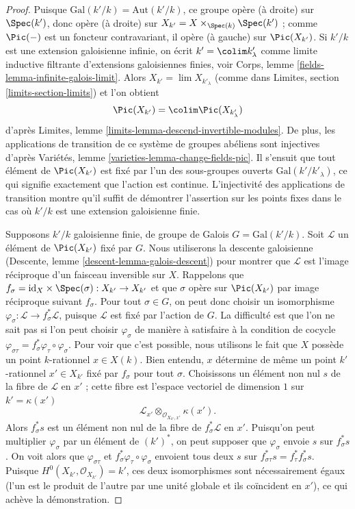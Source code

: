 \begin{proof}
Puisque $\text{Gal}(k'/k) = \text{Aut}(k'/k)$, ce groupe opère (à droite)
sur $\Spec(k')$, donc opère (à droite) sur
$X_{k'} = X \times_{\Spec(k)} \Spec(k')$ ; comme $\Pic(-)$
est un foncteur contravariant, il opère (à gauche) sur $\Pic(X_{k'})$.
Si $k'/k$ est une extension galoisienne infinie, on écrit
$k' = \colim k'_\lambda$ comme limite inductive filtrante d'extensions galoisiennes
finies, voir Corps, lemme \ref{fields-lemma-infinite-galois-limit}.
Alors $X_{k'} = \lim X_{k'_\lambda}$
(comme dans Limites, section \ref{limits-section-limits})
et l'on obtient
$$
\Pic(X_{k'}) = \colim \Pic(X_{k'_\lambda})
$$
d'après Limites, lemme \ref{limits-lemma-descend-invertible-modules}.
De plus, les applications de transition de ce système de groupes abéliens
sont injectives d'après Variétés, lemme \ref{varieties-lemma-change-fields-pic}.
Il s'ensuit que tout élément de $\Pic(X_{k'})$ est fixé par
l'un des sous-groupes ouverts $\text{Gal}(k'/k'_\lambda)$, ce qui signifie exactement
que l'action est continue. L'injectivité des applications de transition
montre qu'il suffit de démontrer l'assertion sur les points fixes dans le
cas où $k'/k$ est une extension galoisienne finie.

\medskip\noindent
Supposons $k'/k$ galoisienne finie, de groupe de Galois $G = \text{Gal}(k'/k)$.
Soit $\mathcal{L}$ un élément de $\Pic(X_{k'})$ fixé par $G$.
Nous utiliserons la descente galoisienne (Descente, lemme \ref{descent-lemma-galois-descent})
pour montrer que $\mathcal{L}$ est l'image réciproque d'un faisceau inversible sur $X$.
Rappelons que $f_\sigma = \text{id}_X \times \Spec(\sigma) : X_{k'} \to X_{k'}$
et que $\sigma$ opère sur $\Pic(X_{k'})$ par image réciproque suivant $f_\sigma$.
Pour tout $\sigma \in G$, on peut donc choisir un isomorphisme
$\varphi_\sigma : \mathcal{L} \to f_\sigma^*\mathcal{L}$,
puisque $\mathcal{L}$ est fixé par l'action de $G$.
La difficulté est que l'on ne sait pas si l'on peut choisir
$\varphi_\sigma$ de manière à satisfaire à la condition de cocycle
$\varphi_{\sigma\tau} = f_\sigma^*\varphi_\tau \circ \varphi_\sigma$.
Pour voir que c'est possible, nous utilisons le fait que $X$ possède un point $k$-rationnel
$x \in X(k)$. Bien entendu, $x$ détermine de même un point $k'$-rationnel
$x' \in X_{k'}$ fixé par $f_\sigma$ pour tout $\sigma$.
Choisissons un élément non nul $s$ de la fibre de $\mathcal{L}$ en $x'$ ;
cette fibre est l'espace vectoriel de dimension $1$ sur $k' = \kappa(x')$
$$
\mathcal{L}_{x'} \otimes_{\mathcal{O}_{X_{k'}, x'}} \kappa(x').
$$
Alors $f_\sigma^*s$ est un élément non nul de la fibre de
$f_\sigma^*\mathcal{L}$ en $x'$. Puisqu'on peut multiplier $\varphi_\sigma$
par un élément de $(k')^*$, on peut supposer que $\varphi_\sigma$ envoie
$s$ sur $f_\sigma^*s$. On voit alors que $\varphi_{\sigma\tau}$ et
$f_\sigma^*\varphi_\tau \circ \varphi_\sigma$
envoient tous deux $s$ sur $f_{\sigma\tau}^*s = f_\tau^*f_\sigma^*s$.
Puisque $H^0(X_{k'}, \mathcal{O}_{X_{k'}}) = k'$, ces deux isomorphismes
sont nécessairement égaux (l'un est le produit de l'autre par une unité globale
et ils coïncident en $x'$), ce qui achève la démonstration.
\end{proof}

